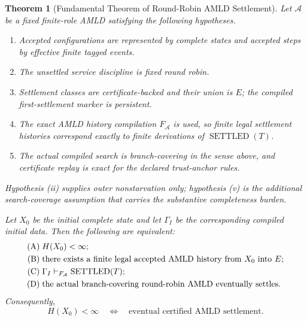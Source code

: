 \documentclass[11pt]{article}
\newtheorem{theorem}[definition]{Theorem}
\theoremstyle{remark}
\newcommand{\Sett}{\operatorname{SETTLED}}
\begin{document}
\begin{theorem}[Fundamental Theorem of Round-Robin AMLD Settlement]\label{thm:fundamental}
Let $\mathcal A$ be a fixed finite-role AMLD satisfying the following hypotheses.
\begin{enumerate}[label=(\roman*)]
\item Accepted configurations are represented by complete states and accepted steps by effective finite tagged events.
\item The unsettled service discipline is fixed round robin.
\item Settlement classes are certificate-backed and their union is $E$; the compiled first-settlement marker is persistent.
\item The exact AMLD history compilation $F_{\mathcal A}$ is used, so finite legal settlement histories correspond exactly to finite derivations of $\Sett(T)$.
\item The actual compiled search is branch-covering in the sense above, and certificate replay is exact for the declared trust-anchor rules.
\end{enumerate}
Hypothesis (ii) supplies outer nonstarvation only; hypothesis (v) is the additional search-coverage assumption that carries the substantive completeness burden.

Let $X_0$ be the initial complete state and let $\Gamma_I$ be the corresponding compiled initial data.  Then the following are equivalent:
\begin{align*}
\textnormal{(A)}\;&H(X_0)<\infty;\\
\textnormal{(B)}\;&\text{there exists a finite legal accepted AMLD history from $X_0$ into $E$};\\
\textnormal{(C)}\;&\Gamma_I\vdash_{F_{\mathcal A}}\Sett(T);\\
\textnormal{(D)}\;&\text{the actual branch-covering round-robin AMLD eventually settles.}
\end{align*}
Consequently,
\[
\boxed{H(X_0)<\infty\quad\Longleftrightarrow\quad\text{eventual certified AMLD settlement}.}
\]
\end{theorem}
\end{document}
